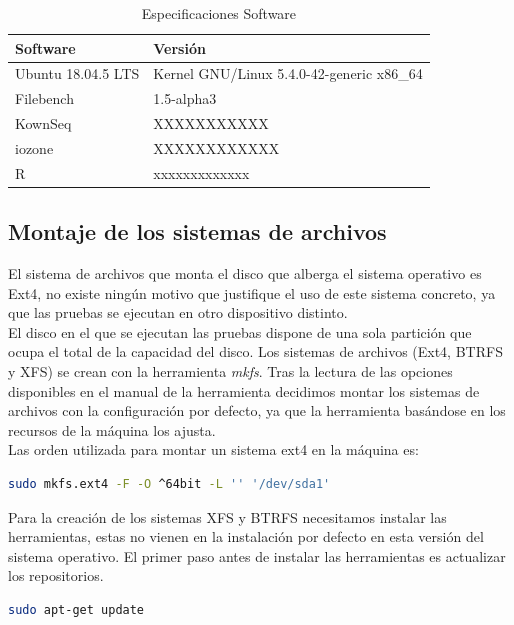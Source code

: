 \begin{table}[H]
    \centering
    \begin{tabular}{|l|l|}
    \hline
        Software & Versión \\ \hline\hline
        Ubuntu 18.04.5 LTS & Kernel GNU/Linux 5.4.0-42-generic x86\_64 \\ \hline
        Filebench & 1.5-alpha3 \\ \hline
        KownSeq & XXXXXXXXXXX \\ \hline
        iozone & XXXXXXXXXXXX \\ \hline
        R & xxxxxxxxxxxxx \\ \hline
    \end{tabular}
    \caption{Especificaciones Software}
\label{table:2}
\end{table}

\subsection{Montaje de los sistemas de archivos}
El sistema de archivos que monta el disco que alberga el sistema operativo es Ext4, no existe ningún motivo que justifique el uso de este sistema concreto, ya que las pruebas se ejecutan en otro dispositivo distinto. \\

El disco en el que se ejecutan las pruebas dispone de una sola partición que ocupa el total de la capacidad del disco. Los sistemas de archivos (Ext4, BTRFS y XFS) se crean con la herramienta \textit{mkfs}. Tras la lectura de las opciones disponibles en el manual de la herramienta \cite{tso} decidimos montar los sistemas de archivos con la configuración por defecto, ya que la herramienta basándose en los recursos de la máquina los ajusta.\\

Las orden utilizada para montar un sistema ext4 en la máquina es:

\begin{lstlisting}[language=bash]
 sudo mkfs.ext4 -F -O ^64bit -L '' '/dev/sda1'
\end{lstlisting}

Para la creación de los sistemas XFS y BTRFS necesitamos instalar las herramientas, estas no vienen en la instalación por defecto en esta versión del sistema operativo. El primer paso antes de instalar las herramientas es actualizar los repositorios.
\begin{lstlisting}[language=bash]
sudo apt-get update
\end{lstlisting}

